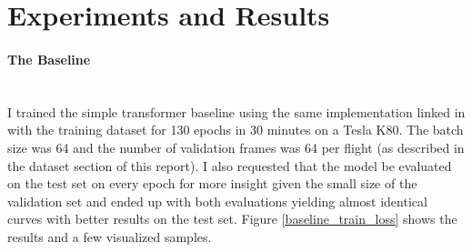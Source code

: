 \documentclass{article}
\begin{document}
\section{Experiments and Results}
\paragraph{The Baseline}$ $
\\I trained the simple transformer baseline using the same implementation linked in \cite{giuliari2020transformer} with the training dataset for 130 epochs in 30 minutes on a Tesla K80. The batch size was 64 and the number of validation frames was 64 per flight (as described in the dataset section of this report).  I also requested that the model be evaluated on the test set on every epoch for more insight given the small size of the validation set and ended up with both evaluations yielding almost identical curves with better results on the test set.  Figure \ref{baseline_train_loss} shows the results and a few visualized samples. 
\end{document}
